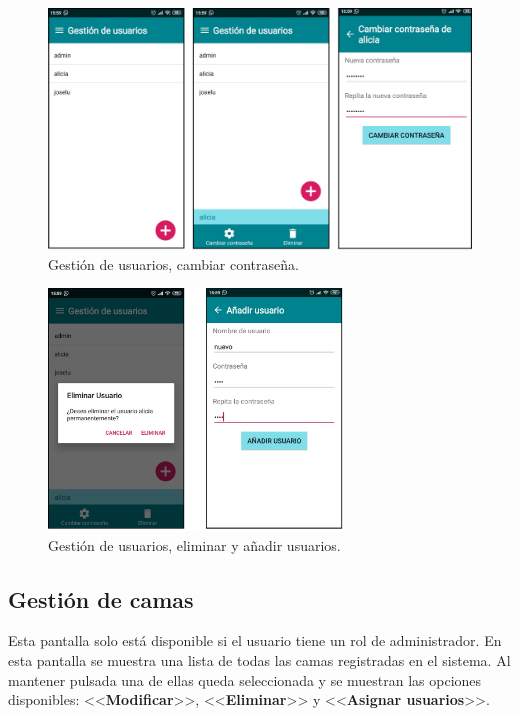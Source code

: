 \begin{figure}[H]
	\centering
	\includegraphics[width=1\textwidth]{../img/gestiondeusuarios.png}
	\caption{Gestión de usuarios, cambiar contraseña.}
	\label{fig:gestiondeusuarios}
\end{figure}

\begin{figure}[H]
	\centering
	\includegraphics[width=0.7\textwidth]{../img/eliminaranadir.png}
	\caption{Gestión de usuarios, eliminar y añadir usuarios.}
	\label{fig:eliminaranadir}
\end{figure}

\subsection{Gestión de camas}

Esta pantalla solo está disponible si el usuario tiene un rol de administrador. En esta pantalla se muestra una lista de todas las camas registradas en el sistema. Al mantener pulsada una de ellas queda seleccionada y se muestran las opciones disponibles: <<\textbf{Modificar}>>, <<\textbf{Eliminar}>> y <<\textbf{Asignar usuarios}>>.  

